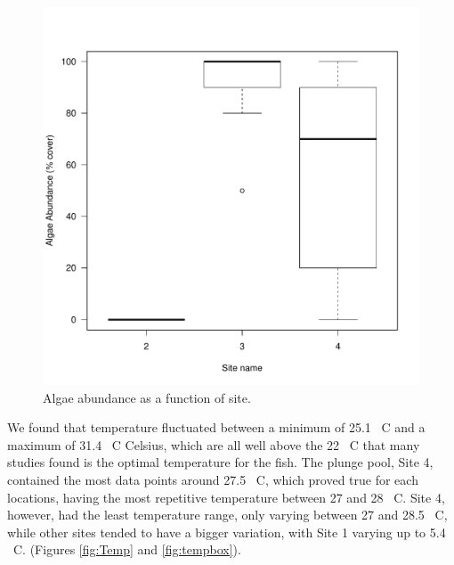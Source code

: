 \documentclass{article}\usepackage[]{graphicx}\usepackage[]{color}
\makeatletter
\def\maxwidth{ %
  \ifdim\Gin@nat@width>\linewidth
    \linewidth
  \else
    \Gin@nat@width
  \fi
}
\newenvironment{knitrout}{}{} %
\makeatother
\begin{document}
\begin{figure}[!ht]
\begin{knitrout}
\color{fgcolor}
\includegraphics[width=\maxwidth]{figure/unnamed-chunk-3-1} 

\end{knitrout}
\caption{Algae abundance as a function of site.}
\label{fig:algaesite}
\end{figure}

We found that temperature fluctuated between a minimum of 25.1 \textdegree~C and a maximum of 31.4 \textdegree~C Celsius, which are all well above the 22 \textdegree~C that many studies found is the optimal temperature for the fish. The plunge pool, Site 4, contained the most data points around 27.5 \textdegree~C, which proved true for each locations, having the most repetitive temperature between 27 and 28 \textdegree~C. Site 4, however, had the least temperature range, only varying between 27 and 28.5 \textdegree~C, while other sites tended to have a bigger variation, with Site 1 varying up to 5.4 \textdegree~C. (Figures \ref{fig:Temp} and \ref{fig:tempbox}).
\end{document}
